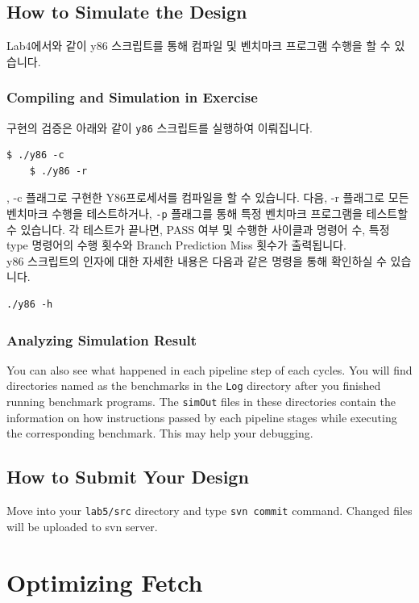 \documentclass{article}
\begin{document}
\subsection{How to Simulate the Design}
Lab4에서와 같이 y86 스크립트를 통해 컴파일 및 벤치마크 프로그램 수행을 할 수 있습니다.
\subsubsection{Compiling and Simulation in Exercise}
 구현의 검증은 아래와 같이 \texttt{y86}
 스크립트를 실행하여 이뤄집니다. 
\begin{Verbatim}[frame=single]
    $ ./y86 -c 
    $ ./y86 -r
\end{Verbatim}
, -c 플래그로 구현한 Y86프로세서를 컴파일을 할 수 있습니다.
다음, -r 플래그로 모든 벤치마크 수행을 테스트하거나, \texttt{-p} 플래그를 통해 특정 벤치마크 프로그램을 
테스트할 수 있습니다. 각 테스트가 끝나면, PASS 여부 및 수행한 사이클과 명령어 수,
특정 type 명령어의 수행 횟수와 Branch Prediction Miss 횟수가 출력됩니다.\\
y86 스크립트의 인자에 대한 자세한 내용은 다음과 같은 명령을 통해 확인하실 수 있습니다.
\
\begin{Verbatim}[frame=single]
./y86 -h
\end{Verbatim}

\subsubsection{Analyzing Simulation Result}
You can also see what happened in each pipeline step of each cycles.
You will find directories named as the benchmarks in the \texttt{Log} directory
after you finished running benchmark programs. The \texttt{simOut} files in these
directories contain the information on how instructions passed by each pipeline stages
while executing the corresponding benchmark. This may help your debugging.

\subsection{How to Submit Your Design}
Move into your \texttt{lab5/src} directory and type \texttt{svn commit} command.
Changed files will be uploaded to svn server.

\section{Optimizing Fetch}
\end{document}
